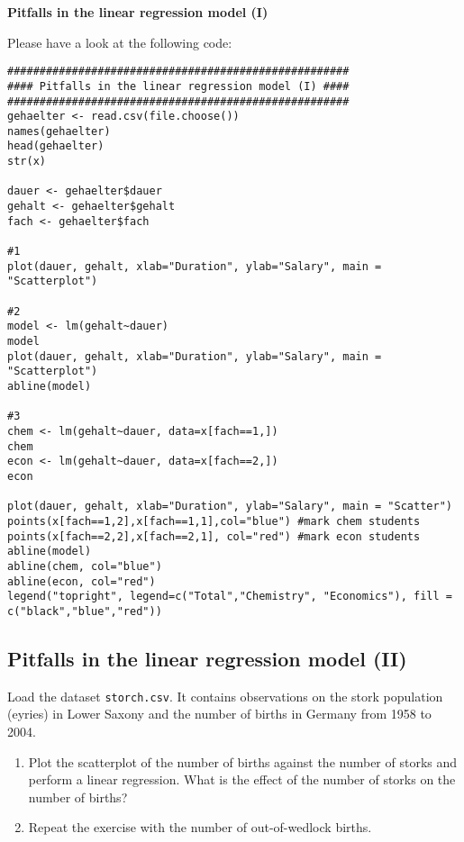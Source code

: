 \documentclass{article}
\begin{document}
\begin{solution}
\textbf{Pitfalls in the linear regression model (I)}

Please have a look at the following code:
\begin{verbatim}
#####################################################
#### Pitfalls in the linear regression model (I) ####
#####################################################
gehaelter <- read.csv(file.choose())
names(gehaelter)
head(gehaelter)
str(x)

dauer <- gehaelter$dauer
gehalt <- gehaelter$gehalt
fach <- gehaelter$fach

#1
plot(dauer, gehalt, xlab="Duration", ylab="Salary", main = "Scatterplot")

#2
model <- lm(gehalt~dauer)
model
plot(dauer, gehalt, xlab="Duration", ylab="Salary", main = "Scatterplot")
abline(model)

#3
chem <- lm(gehalt~dauer, data=x[fach==1,])
chem
econ <- lm(gehalt~dauer, data=x[fach==2,])
econ

plot(dauer, gehalt, xlab="Duration", ylab="Salary", main = "Scatter")
points(x[fach==1,2],x[fach==1,1],col="blue") #mark chem students
points(x[fach==2,2],x[fach==2,1], col="red") #mark econ students
abline(model)
abline(chem, col="blue")
abline(econ, col="red")
legend("topright", legend=c("Total","Chemistry", "Economics"), fill = c("black","blue","red"))
\end{verbatim}
\end{solution}

\subsection{Pitfalls in the linear regression model (II)}

Load the dataset \texttt{storch.csv}. It contains observations on the stork
population (eyries) in Lower Saxony and the number of births in Germany from
1958 to 2004.

\begin{enumerate}
\item Plot the scatterplot of the number of births against the number of
storks and perform a linear regression. What is the effect of the number of
storks on the number of births?

\item Repeat the exercise with the number of out-of-wedlock births.
\end{enumerate}
\end{document}
